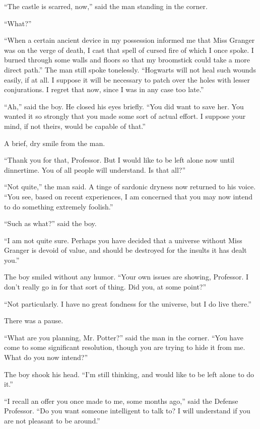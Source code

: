 ``The castle is scarred, now,'' said the man standing in the corner.

``What?''

``When a certain ancient device in my possession informed me that Miss
Granger was on the verge of death, I cast that spell of cursed fire of
which I once spoke. I burned through some walls and floors so that my
broomstick could take a more direct path.'' The man still spoke
tonelessly. ``Hogwarts will not heal such wounds easily, if at all. I
suppose it will be necessary to patch over the holes with lesser
conjurations. I regret that now, since I was in any case too late.''

``Ah,'' said the boy. He closed his eyes briefly. ``You did want to save
her. You wanted it so strongly that you made some sort of actual effort.
I suppose your mind, if not theirs, would be capable of that.''

A brief, dry smile from the man.

``Thank you for that, Professor. But I would like to be left alone now
until dinnertime. You of all people will understand. Is that all?''

``Not quite,'' the man said. A tinge of sardonic dryness now returned to
his voice. ``You see, based on recent experiences, I am concerned that
you may now intend to do something extremely foolish.''

``Such as what?'' said the boy.

``I am not quite sure. Perhaps you have decided that a universe without
Miss Granger is devoid of value, and should be destroyed for the insults
it has dealt you.''

The boy smiled without any humor. ``Your own issues are showing,
Professor. I don't really go in for that sort of thing. Did you, at some
point?''

``Not particularly. I have no great fondness for the universe, but I do
live there.''

There was a pause.

``What are you planning, Mr. Potter?'' said the man in the corner. ``You
have come to some significant resolution, though you are trying to hide
it from me. What do you now intend?''

The boy shook his head. ``I'm still thinking, and would like to be left
alone to do it.''

``I recall an offer you once made to me, some months ago,'' said the
Defense Professor. ``Do you want someone intelligent to talk to? I will
understand if you are not pleasant to be around.''

